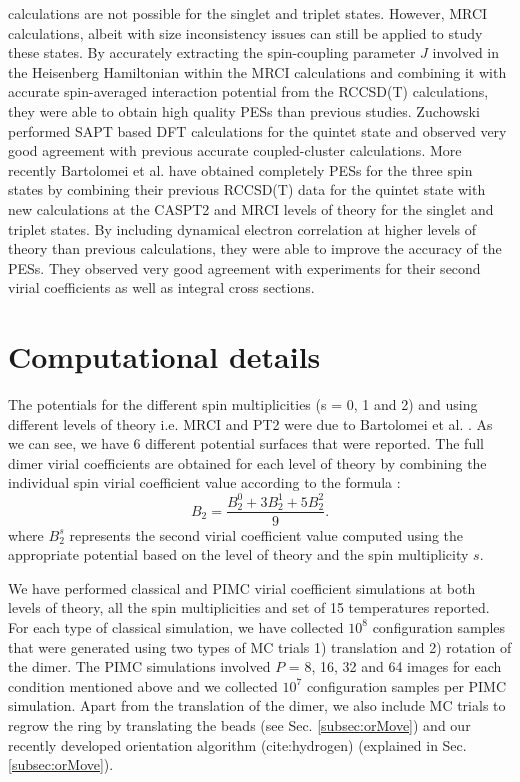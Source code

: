 calculations are not possible for the singlet and triplet states. However, MRCI calculations, albeit with size inconsistency issues can still be applied to study these states. By accurately extracting the spin-coupling parameter $J$ involved in the Heisenberg Hamiltonian within the MRCI calculations and combining it with accurate spin-averaged interaction potential from the RCCSD(T) calculations, they were able to obtain high quality PESs than previous studies. Zuchowski \cite{Zuchowski2008} performed SAPT based DFT calculations for the quintet state and observed very good agreement with previous accurate \abinitio{} coupled-cluster calculations. More recently Bartolomei et al. \cite{Bartolomei2010} have obtained completely \abinitio{} PESs for the three spin states by combining their previous RCCSD(T) data \cite{Bartolomei2008} for the quintet state with new \abinitio{} calculations at the CASPT2 and MRCI levels of theory for the singlet and triplet states. By including dynamical electron correlation at higher levels of theory than previous calculations, they were able to improve the accuracy of the PESs. They observed very good agreement with experiments for their second virial coefficients as well as integral cross sections.
\section{Computational details}
    The \abinitio{} potentials for the different spin multiplicities (s = 0, 1 and 2) and using different levels of theory i.e. MRCI and PT2 were due to Bartolomei et al. \cite{Bartolomei2010}. As we can see, we have 6 different potential surfaces that were reported. The full dimer virial coefficients are obtained for each level of theory by combining the individual spin virial coefficient value according to the formula \cite{Aquilanti1999,Bartolomei2010}:
    \begin{equation}
        B_2 = \frac{B_2^0 + 3 B_2^1 + 5 B_2^2}{9}.
    \end{equation}
    where $B_2^s$ represents the second virial coefficient value computed using the appropriate potential based on the level of theory and the spin multiplicity $s$.

    We have performed classical and PIMC virial coefficient simulations at both levels of theory, all the spin multiplicities and set of 15 temperatures reported. For each type of classical simulation, we have collected $10^8$ configuration samples that were generated using two types of MC trials 1) translation and 2) rotation of the dimer. The PIMC simulations involved $P$ = 8, 16, 32 and 64 images for each condition mentioned above and we collected $10^7$ configuration samples per PIMC simulation. Apart from the translation of the dimer, we also include MC trials to regrow the ring by translating the beads (see Sec. \ref{subsec:orMove}) and our recently developed orientation algorithm (cite:hydrogen) (explained in Sec. \ref{subsec:orMove}).

